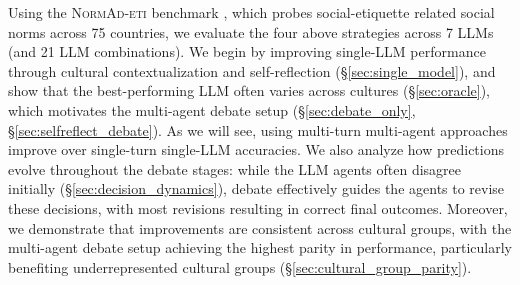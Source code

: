 Using the \textsc{NormAd-eti} benchmark \cite{normad}, which probes social-etiquette related social norms across 75 countries, we evaluate the four above strategies across 7 LLMs (and 21 LLM combinations). We begin by improving single-LLM performance through cultural contextualization and self-reflection (\S \ref{sec:single_model}), and show that the best-performing LLM often varies across cultures (\S \ref{sec:oracle}), which motivates the multi-agent debate setup (\S \ref{sec:debate_only}, \S \ref{sec:selfreflect_debate}). As we will see, using multi-turn multi-agent approaches improve over single-turn single-LLM accuracies.  We also analyze how predictions evolve throughout the debate stages: while the  LLM agents often disagree initially (\S \ref{sec:decision_dynamics}), debate effectively guides the agents to revise these decisions, with most revisions resulting in correct final outcomes. Moreover, we demonstrate that improvements are consistent across cultural groups, with the multi-agent debate setup achieving the highest parity in performance, particularly benefiting underrepresented cultural groups (\S \ref{sec:cultural_group_parity}).







